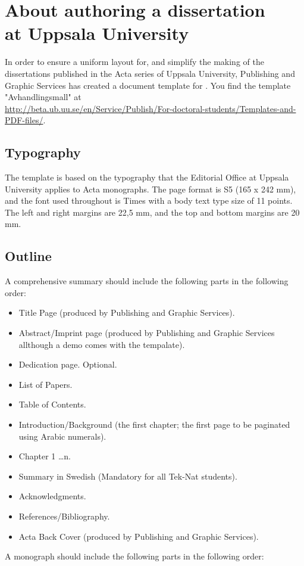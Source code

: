 \chapter{About authoring a dissertation\\at Uppsala University}
In order to ensure a uniform layout for, and simplify the making of the dissertations published in the Acta series of Uppsala
University, Publishing and Graphic Services has created a document template for \LaTeXe{}. You find the template "Avhandlingsmall" at \\\href{http://beta.ub.uu.se/en/Service/Publish/For-doctoral-students/Templates-and-PDF-files/}{http://beta.ub.uu.se/en/Service/Publish/For-doctoral-students/Templates-and-PDF-files/}.
\section{Typography}
The template is based on the typography that the Editorial Office at Uppsala University applies to Acta
monographs. The page format is S5 (165 x 242 mm), and the font used throughout is Times with a body text type size of 11 points. The left and right margins are 22,5 mm, and the top and bottom margins are 20 mm.
\section{Outline}
A comprehensive summary should include the following parts in the following order:
\begin{itemize}
    \item Title Page (produced by Publishing and Graphic Services).
    \item Abstract/Imprint page (produced by Publishing and Graphic Services allthough a demo comes with the tempalate).
    \item Dedication page. Optional.
    \item List of Papers.
    \item Table of Contents.
    \item Introduction/Background (the first chapter; the first page to be paginated using Arabic numerals).
    \item Chapter 1 \ldots n.
    \item Summary in Swedish (Mandatory for all Tek-Nat students).
    \item Acknowledgments.
    \item References/Bibliography.
    \item Acta Back Cover (produced by Publishing and Graphic Services).
\end{itemize}
\vspace{1\baselineskip}
A monograph should include the following parts in the following order:


